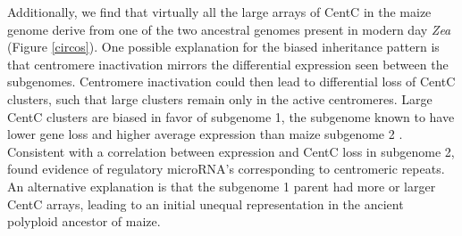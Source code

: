 Additionally, we find that virtually all the large arrays of CentC in the maize  genome derive from one of the two ancestral genomes present in modern day \emph{Zea} (Figure \ref{circos}).  
One possible explanation for the biased inheritance pattern is that centromere inactivation mirrors the differential expression seen between the subgenomes.  
Centromere inactivation could then lead to differential loss of CentC clusters, such that large clusters remain only in the active centromeres.
Large CentC clusters are biased in favor of subgenome 1, the subgenome known to have lower gene loss and higher average expression than maize subgenome 2 \citep{Schnable2011}. 
Consistent with a correlation between expression and CentC loss in subgenome 2, \citet{ReinhartBartel2002} found evidence of regulatory microRNA’s corresponding to centromeric repeats.   
An alternative explanation is that the subgenome 1 parent had more or larger CentC arrays, leading to an initial unequal representation in the ancient polyploid ancestor of maize.



